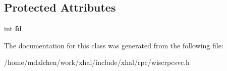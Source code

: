 \subsection*{Protected Attributes}
\begin{DoxyCompactItemize}
\item 
\hypertarget{classwisc_1_1RPCSvc_ac46fca815dfae1c7ce29ded5809330d9}{
int {\bfseries fd}}
\label{classwisc_1_1RPCSvc_ac46fca815dfae1c7ce29ded5809330d9}

\end{DoxyCompactItemize}


The documentation for this class was generated from the following file:\begin{DoxyCompactItemize}
\item 
/home/mdalchen/work/xhal/include/xhal/rpc/wiscrpcsvc.h\end{DoxyCompactItemize}
